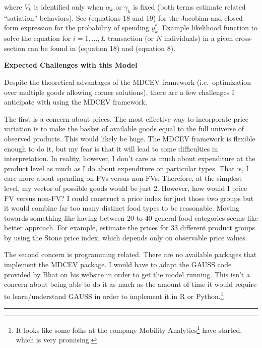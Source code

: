 \documentclass[12pt,letterpaperpaper,]{book}
\renewcommand{\href}[2]{#2\footnote{\url{#1}}}
\begin{document}
where \(V_k\) is identified only when \(\alpha_k\) or \(\gamma_k\) is
fixed (both terms estimate related ``satiation'' behaviors). See
\citet{bhat_multiple_2008} (equations 18 and 19) for the Jacobian and
closed form expression for the probability of spending \(y_k^*\).
Example likelihood function to solve the equation for \(i=1,...,L\)
transaction (or \(N\) individuals) in a given cross-section can be found
in \citet{bhat_multiple_2005} (equation 18) and
\citet{bhat_household_2006} (equation 8).

\textbf{Expected Challenges with this Model}

Despite the theoretical advantages of the MDCEV framework
(i.e.~optimization over multiple goods allowing corner solutions), there
are a few challenges I anticipate with using the MDCEV framework.

The first is a concern about prices. The most effective way to
incorporate price variation is to make the basket of available goods
equal to the full universe of observed products. This would likely be
huge. The MDCEV framework is flexible enough to do it, but my fear is
that it will lead to some difficulties in interpretation. In reality,
however, I don't care as much about expenditure at the product level as
much as I do about expenditure on particular types. That is, I care more
about spending on FVs versus non-FVs. Therefore, at the simplest level,
my vector of possible goods would be just 2. However, how would I price
FV versus non-FV? I could construct a price index for just those two
groups but it would combine far too many distinct food types to be
reasonable. Moving towards something like having between 20 to 40
general food categories seems like better approach. For example,
\citet{harding_effect_2014} estimate the prices for 33 different product
groups by using the Stone price index, which depends only on observable
price values.

The second concern is programming related. There are no available
packages that implement the MDCEV package. I would have to adapt the
GAUSS code provided by Bhat on his website in order to get the model
running. This isn't a concern about being able to do it as much as the
amount of time it would require to learn/understand GAUSS in order to
implement it in R or Python.\footnote{It looks like some folks at the
  company \href{http://www.mobilityanalytics.org}{Mobility Analytics}
  have started, which is very promising.}

\newpage

\begin{center}\rule{0.5\linewidth}{\linethickness}\end{center}
\end{document}
